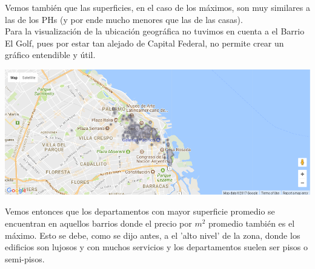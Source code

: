 \documentclass[a4paper, 10pt]{article}
\newcommand\tab[1][0.5cm]{\hspace*{#1}}
\begin{document}
				  	\tab Vemos también que las superficies, en el caso de los máximos, son muy similares a las de los PHs (y por ende
				  	mucho menores que las de las casas). \\
				  	\tab Para la visualización de la ubicación geográfica no tuvimos en cuenta a el Barrio El Golf, pues por estar
				  	tan alejado de Capital Federal, no permite crear un gráfico entendible y útil.
				  	\begin{center}
   		    				\includegraphics[width=\textwidth]{images/apartmentSurfaceTopMap}
				  	\end{center}
				  	\tab Vemos entonces que los departamentos con mayor superficie promedio se encuentran en aquellos barrios donde
				  	el precio por $m^2$ promedio también es el máximo. Esto se debe, como se dijo antes, a el 'alto nivel' de la
				  	zona, donde los edificios son lujosos y con muchos servicios y los departamentos suelen ser pisos o semi-pisos.
\end{document}
